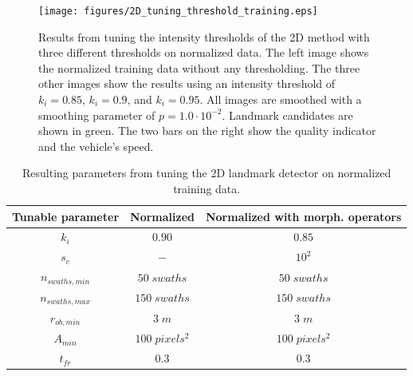 \begin{figure}  %
  \centering
  \texttt{[image: figures/2D\_tuning\_threshold\_training.eps]}
  \caption[Results of tuning intensity threshold the 2D method]{Results from tuning the intensity thresholds of the 2D method with three different thresholds on normalized data. The left image shows the normalized training data without any thresholding. The three other images show the results using an intensity threshold of $k_i = 0.85$, $k_i = 0.9$, and $k_i = 0.95$. All images are smoothed with a smoothing parameter of $p = 1.0 \cdot 10^{-2}$. Landmark candidates are shown in green. The two bars on the right show the quality indicator and the vehicle's speed.}
  \label{fig:2D_tuning_intensity_thres}
\end{figure}

\begin{table} 
    \caption{Resulting parameters from tuning the 2D landmark detector on normalized training data.}
    \centering
    \begin{tabular}{ccc}
        \hline
        \textbf{Tunable parameter} & \textbf{Normalized} & \textbf{Normalized with morph. operators} \\ \hline
        $k_i$                      & $0.90$               & $0.85$                                    \\
        $s_c$                      & $-$                 & $10^2$                                    \\
        $n_{swaths, min}$          & $50 \; swaths$      & $50 \; swaths$                            \\
        $n_{swaths, max}$          & $150\; swaths$      & $150 \; swaths$                           \\
        $r_{ob, min}$              & $3 \; m$            & $3 \; m$                                  \\ 
        $A_{min}$                  & $100 \; pixels^2$   & $100 \; pixels^2$                         \\
        $t_{fr}$                   & $0.3$               & $0.3$                                     \\ \hline
        
    \end{tabular}
    \label{tab:2D_parameters}
\end{table}

